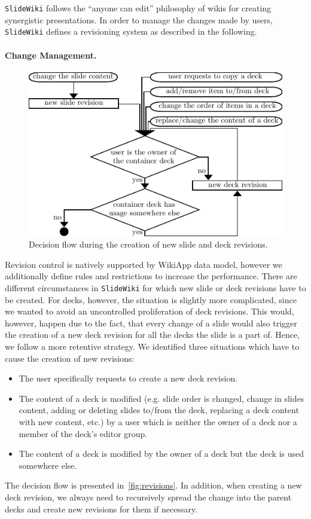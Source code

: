 \documentclass[PhD, Submit, ngerman,UKenglish,table]{scrbook}
\begin{document}
\texttt{SlideWiki} follows the ``anyone can edit'' philosophy of wikis for creating synergistic presentations.
In order to manage the changes made by users, \texttt{SlideWiki} defines a revisioning system as described in the following.

\paragraph{Change Management.}
\label{par:change_management}
\begin{figure}[htb]
	\centering
		\includegraphics[width=.7\columnwidth]{images/revisions.pdf}
	\caption{Decision flow during the creation of new slide and deck revisions.}
	\label{fig:revisions}
\end{figure}

Revision control is natively supported by WikiApp data model, however we additionally define rules and restrictions to increase the performance.
There are different circumstances in \texttt{SlideWiki} for which new slide or deck revisions have to be created.
For decks, however, the situation is slightly more complicated, since we wanted to avoid an uncontrolled proliferation of deck revisions.
This would, however, happen due to the fact, that every change of a slide would also trigger the creation of a new deck revision for all the decks the slide is a part of.
Hence, we follow a more retentive strategy.
We identified three situations which have to cause the creation of new revisions:
\begin{itemize}
	\item The user specifically requests to create a new deck revision.
	\item The content of a deck is modified (e.g. slide order is changed, change in slides content, adding or deleting slides to/from the deck, replacing a deck content with new content, etc.) by a user which is neither the owner of a deck nor a member of the deck's editor group.
	\item The content of a deck is modified by the owner of a deck but the deck is used somewhere else.
\end{itemize}
The decision flow is presented in~\autoref{fig:revisions}.
In addition, when creating a new deck revision, we always need to recursively spread the change into the parent decks and create new revisions for them if necessary.
\end{document}
